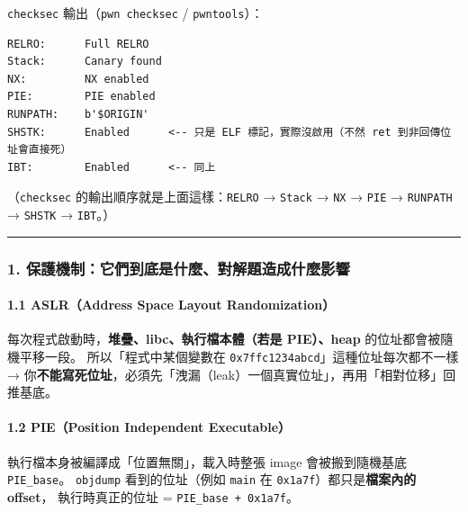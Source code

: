\documentclass[10pt,a4paper]{article}
\renewenvironment{quote}{%
  \begin{mdframed}[linewidth=0pt,innerleftmargin=0pt,innerrightmargin=0pt,
    innerbottommargin=0pt,innertopmargin=0pt,skipabove=0.55em,skipbelow=0.55em,
    leftmargin=0.9em,rightmargin=0.4em,startcode={\color{quotebar}\vrule width 2.6pt},%
    endcode={}]%
  \itshape\color{black}%
}{%
  \end{mdframed}%
}
\begin{document}
\texttt{checksec} 輸出（\texttt{pwn\ \allowbreak{}checksec} / \texttt{pwntools}）：

\begin{Verbatim}[breaklines=true,breakanywhere=true,breakautoindent=false,fontsize=\fontsize{7.0}{9.5}\selectfont]
RELRO:      Full RELRO
Stack:      Canary found
NX:         NX enabled
PIE:        PIE enabled
RUNPATH:    b'$ORIGIN'
SHSTK:      Enabled      <-- 只是 ELF 標記，實際沒啟用（不然 ret 到非回傳位址會直接死）
IBT:        Enabled      <-- 同上
\end{Verbatim}

\begin{quote}
（\texttt{checksec} 的輸出順序就是上面這樣：\texttt{RELRO} →
\texttt{Stack} → \texttt{NX} → \texttt{PIE} → \texttt{RUNPATH} →
\texttt{SHSTK} → \texttt{IBT}。）
\end{quote}

\begin{center}\rule{0.5\linewidth}{0.5pt}\end{center}

\subsubsection{1.
保護機制：它們到底是什麼、對解題造成什麼影響}\label{ux4fddux8b77ux6a5fux5236ux5b83ux5011ux5230ux5e95ux662fux4ec0ux9ebcux5c0dux89e3ux984cux9020ux6210ux4ec0ux9ebcux5f71ux97ff}

\paragraph{1.1 ASLR（Address Space Layout
Randomization）}\label{aslraddress-space-layout-randomization}

每次程式啟動時，\textbf{堆疊、libc、執行檔本體（若是 PIE）、heap}
的位址都會被隨機平移一段。 所以「程式中某個變數在
\texttt{0x7ffc1234abcd}」這種位址每次都不一樣 →
你\textbf{不能寫死位址}，必須先「洩漏（leak）一個真實位址」，再用「相對位移」回推基底。

\paragraph{1.2 PIE（Position Independent
Executable）}\label{pieposition-independent-executable}

執行檔本身被編譯成「位置無關」，載入時整張 image 會被搬到隨機基底
\texttt{PIE\_\allowbreak{}base}。 \texttt{objdump} 看到的位址（例如 \texttt{main} 在
\texttt{0x1a7f}）都只是\textbf{檔案內的 offset}， 執行時真正的位址 =
\texttt{PIE\_\allowbreak{}base\ \allowbreak{}+\ \allowbreak{}0x1a7f}。
\end{document}

